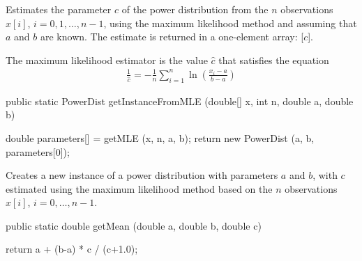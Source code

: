 \begin{tabb}
 Estimates the parameter $c$ of the power distribution from the $n$
   observations $x[i]$, $i = 0, 1, \ldots, n-1$, using the maximum
   likelihood method and assuming that $a$ and $b$ are known. 
   The estimate is returned in a one-element array: [$c$].
   \begin{detailed}
   The maximum likelihood estimator is the value
   $\hat{c}$ that satisfies the equation
   \begin{eqnarray*}
     \frac1{\hat c} =  -\frac1n \sum_{i=1}^{n} \ln\left(\frac{x_i - a}{b - a}
    \right)
   \end{eqnarray*}
   \end{detailed}
\end{tabb}
\begin{htmlonly}
\end{htmlonly}
\begin{code}

   public static PowerDist getInstanceFromMLE (double[] x, int n,
                                               double a, double b)\begin{hide} {
      double parameters[] = getMLE (x, n, a, b);
      return new PowerDist (a, b, parameters[0]);
   }\end{hide}
\end{code}
\begin{tabb}
   Creates a new instance of a power distribution with parameters $a$ and $b$,
   with $c$ estimated using the maximum likelihood method based on the 
   $n$ observations $x[i]$, $i = 0, \ldots, n-1$.
\end{tabb}
\begin{htmlonly}
\end{htmlonly}
\begin{code}

   public static double getMean (double a, double b, double c)\begin{hide} {
      return a + (b-a) * c / (c+1.0);
   }\end{hide}
\end{code}

